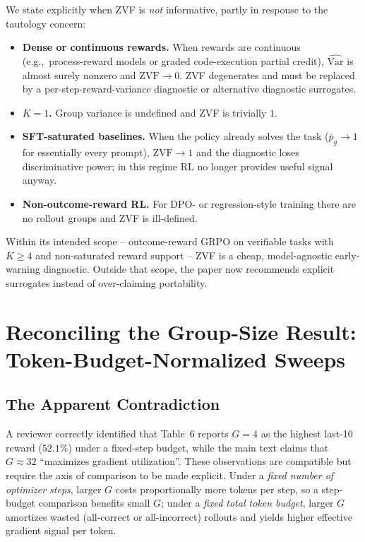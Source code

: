 \documentclass{article}
\begin{document}
We state explicitly when ZVF is \emph{not} informative, partly in response
to the tautology concern:
\begin{itemize}[leftmargin=1.2em,itemsep=0pt]
  \item \textbf{Dense or continuous rewards.} When rewards are continuous
        (e.g.,~process-reward models or graded code-execution partial credit),
        $\widehat{\mathrm{Var}}$ is almost surely nonzero and
        $\mathrm{ZVF} \to 0$. ZVF degenerates and must be replaced by a
        per-step-reward-variance diagnostic or alternative diagnostic surrogates.
  \item \textbf{$K=1$.} Group variance is undefined and ZVF is trivially $1$.
  \item \textbf{SFT-saturated baselines.} When the policy already solves
        the task ($\bar p_g \to 1$ for essentially every prompt),
        $\mathrm{ZVF} \to 1$ and the diagnostic loses discriminative power;
        in this regime RL no longer provides useful signal anyway.
  \item \textbf{Non-outcome-reward RL.} For DPO- or regression-style
        training there are no rollout groups and ZVF is ill-defined.
\end{itemize}
Within its intended scope -- outcome-reward GRPO on verifiable tasks with
$K \ge 4$ and non-saturated reward support -- ZVF is a cheap, model-agnostic
early-warning diagnostic. Outside that scope, the paper now recommends
explicit surrogates instead of over-claiming portability.
 \section{Reconciling the Group-Size Result: Token-Budget-Normalized Sweeps}
\label{sec:appendix:group-size-reconcile}

\subsection{The Apparent Contradiction}

A reviewer correctly identified that Table~6 reports $G{=}4$ as the
highest last-10 reward ($52.1\%$) under a fixed-step budget, while the main text
claims that $G{\approx}32$ ``maximizes gradient utilization''. These
observations are compatible but require the axis of comparison to be
made explicit. Under a \emph{fixed number of optimizer steps}, larger
$G$ costs proportionally more tokens per step, so a step-budget
comparison benefits small $G$; under a \emph{fixed total token budget},
larger $G$ amortizes wasted (all-correct or all-incorrect) rollouts
and yields higher effective gradient signal per token.
\end{document}
